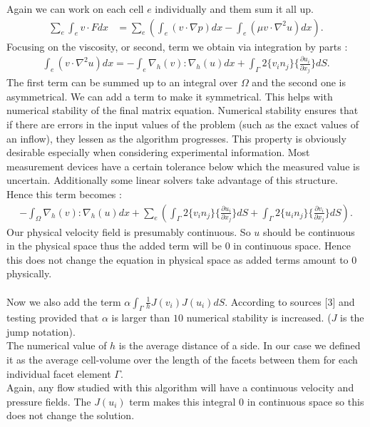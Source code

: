 \documentclass[11pt,twoside,a4paper]{article}
\begin{document}
Again we can work on each cell $e$ individually and them sum it all up.
\begin{align*}
\sum_e \int_e v \cdot F dx &= \sum_e (\int_e (v \cdot \nabla p) dx - \int_e (\mu v \cdot \nabla^2 u) dx) .
\end{align*}
Focusing on the viscosity, or second, term we obtain via integration by parts :
\begin{align*}
\int_e (v \cdot \nabla^2 u) dx = - \int_e \nabla_h(v) : \nabla_h(u) dx + \int_\Gamma 2 \{ v_i n_j \} \{ \frac{\partial u_i}{\partial x_j}\} dS .
\end{align*}
The first term can be summed up to an integral over $\Omega$ and the second one is asymmetrical. We can add a term to make it symmetrical. This helps with numerical stability of the final matrix equation. Numerical stability ensures that if there are errors in the input values of the problem (such as the exact values of an inflow), they lessen as the algorithm progresses. This property is obviously desirable especially when considering experimental information. Most measurement devices have a certain tolerance below which the measured value is uncertain. Additionally some linear solvers take advantage of this structure.\\
Hence this term becomes :
\begin{align*}
-  \int_\Omega \nabla_h(v) : \nabla_h(u) dx + \sum_e( \int_\Gamma 2 \{ v_i n_j \} \{ \frac{\partial u_i}{\partial x_j}\} dS + \int_\Gamma 2 \{ u_i n_j \} \{ \frac{\partial v_i}{\partial x_j}\} dS) .
\end{align*}
Our physical velocity field is presumably continuous.
So $u$ should be continuous in the physical space thus the added term will be $0$ in continuous space. Hence this does not change the equation in physical space as added terms amount to $0$ physically.\\
\\
Now we also add the term $\alpha \int_\Gamma \frac{1}{h}  J(v_i) J(u_i) dS$. According to sources [3] and testing provided that  $\alpha$ is larger than $10$ numerical stability is increased.
($J$ is the jump notation).\\
The numerical value of $h$ is the average distance of a side. In our case we defined it as the average cell-volume over the length of the facets between them for each individual facet element $\Gamma$.\\
Again, any flow studied with this algorithm will have a continuous velocity and pressure fields. The $J(u_i)$ term makes this integral $0$ in continuous space so this does not change the solution.\\
\end{document}
